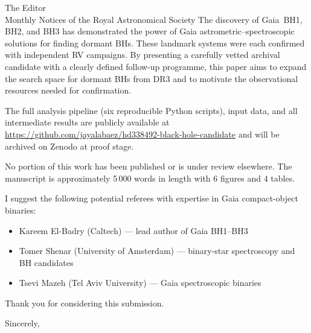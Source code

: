 \documentclass[11pt]{letter}
\begin{document}
\begin{letter}{The Editor\\Monthly Notices of the Royal Astronomical Society}
The discovery of Gaia~BH1, BH2, and BH3 has demonstrated the
power of Gaia astrometric--spectroscopic solutions for finding
dormant BHs.  These landmark systems were each confirmed with
independent RV campaigns.  By presenting a carefully vetted
archival candidate with a clearly defined follow-up programme, this
paper aims to expand the search space for dormant BHs from DR3 and
to motivate the observational resources needed for confirmation.

The full analysis pipeline (six reproducible Python scripts),
input data, and all intermediate results are publicly available at
\url{https://github.com/jayalabaez/hd338492-black-hole-candidate}
and will be archived on Zenodo at proof stage.

No portion of this work has been published or is under review
elsewhere.  The manuscript is approximately 5\,000 words in
length with 6 figures and 4 tables.

I suggest the following potential referees with expertise in Gaia
compact-object binaries:
\begin{itemize}
\item Kareem El-Badry (Caltech) --- lead author of Gaia BH1--BH3
\item Tomer Shenar (University of Amsterdam) --- binary-star
  spectroscopy and BH candidates
\item Tsevi Mazeh (Tel Aviv University) --- Gaia spectroscopic
  binaries
\end{itemize}

Thank you for considering this submission.

\closing{Sincerely,}
\end{letter}
\end{document}
